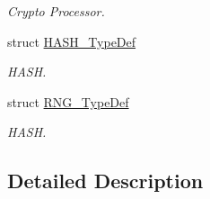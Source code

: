 \begin{DoxyCompactItemize}
\begin{DoxyCompactList}\small\item\em Crypto Processor. \end{DoxyCompactList}\item 
struct \hyperlink{struct_h_a_s_h___type_def}{H\+A\+S\+H\+\_\+\+Type\+Def}
\begin{DoxyCompactList}\small\item\em H\+A\+SH. \end{DoxyCompactList}\item 
struct \hyperlink{struct_r_n_g___type_def}{R\+N\+G\+\_\+\+Type\+Def}
\begin{DoxyCompactList}\small\item\em H\+A\+SH. \end{DoxyCompactList}\end{DoxyCompactItemize}


\subsection{Detailed Description}
